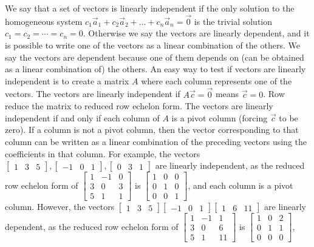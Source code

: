 \documentclass[10pt]{article}
\begin{document}
We say that a set of vectors is linearly independent if the only solution to the homogeneous system {$c_1\vec a_{1}+c_2\vec a_{2}+\ldots+c_n\vec a_{n}=\vec 0$} is the trivial solution {$c_1=c_2=\cdots=c_n=0$}. Otherwise we say the vectors are linearly dependent, and it is possible to write one of the vectors as a linear combination of the others. We say the vectors are dependent because one of them depends on (can be obtained as a linear combination of) the others.
An easy way to test if vectors are linearly independent is to create a matrix $A$ where each column represents one of the vectors. The vectors are linearly independent if $A\vec c=\vec 0$ means $\vec c=0$. Row reduce the matrix to reduced row echelon form. The vectors are linearly independent if and only if each column of $A$ is a pivot column (forcing $\vec c$ to be zero). If a column is not a pivot column, then the vector corresponding to that column can be written as a linear combination of the preceding vectors using the coefficients in that column. For example, the vectors {$
 \begin{bmatrix} 1&3&5\end{bmatrix},
\begin{bmatrix} -1&0&1\end{bmatrix},
 \begin{bmatrix} 0&3&1\end{bmatrix} 
$} are linearly independent, as the reduced row echelon form of 
$ \begin{bmatrix} 1&-1&0\\3&0&3\\5&1&1\end{bmatrix}$ is 
$ \begin{bmatrix} 1&0&0\\0&1&0\\0&0&1\end{bmatrix}$, 
and each column is a pivot column.
However, the vectors 
$
 \begin{bmatrix} 1&3&5\end{bmatrix}
\begin{bmatrix} -1&0&1\end{bmatrix}
 \begin{bmatrix} 1&6&11\end{bmatrix} 
$ are linearly dependent, as the reduced row echelon form of 
$ \begin{bmatrix} 1&-1&1\\3&0&6\\5&1&11\end{bmatrix} $ 
is 
$ \begin{bmatrix} 1&0&2\\0&1&1\\0&0&0\end{bmatrix}$, 
\end{document}

